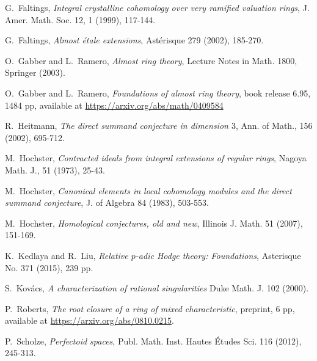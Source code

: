 \documentclass[10pt,reqno]{amsart}
\begin{document}
\begin{thebibliography}{HKM}
G.~Faltings, \emph{Integral crystalline cohomology over very ramified valuation rings}, J. Amer. Math. Soc. 12, 1 (1999), 117-144.

G.~Faltings, \emph{Almost \'etale extensions}, Ast\'erisque 279 (2002), 185-270.

O.~Gabber and L.~Ramero, \emph{Almost ring theory}, Lecture Notes in Math. 1800, Springer (2003).

O.~Gabber and L.~Ramero, \emph{Foundations of almost ring theory}, book release 6.95, 1484 pp, available at \url{https://arxiv.org/abs/math/0409584}

R.~Heitmann, \emph{The direct summand conjecture in dimension $3$}, Ann. of Math., 156 (2002), 695-712.


M.~Hochster, \emph{Contracted ideals from integral extensions of regular rings}, Nagoya Math. J., 51 (1973), 25-43.

M.~Hochster, \emph{Canonical elements in local cohomology modules and the direct summand conjecture}, J. of Algebra 84 (1983), 503-553.

M.~Hochster, \emph{Homological conjectures, old and new}, Illinois J. Math. 51 (2007), 151-169.


K.~Kedlaya and R.~Liu, \emph{Relative $p$-adic Hodge theory: Foundations}, Asterisque No. 371 (2015), 239 pp.

S.~Kov\'acs, \emph{A characterization of rational singularities} Duke Math. J. 102 (2000).

P.~Roberts, \emph{The root closure of a ring of mixed characteristic}, preprint, 6 pp, available at \url{https://arxiv.org/abs/0810.0215}.

P.~Scholze, \emph{Perfectoid spaces},  Publ. Math. Inst. Hautes \'Etudes Sci. 116 (2012), 245-313.


\end{thebibliography}
\end{document}
